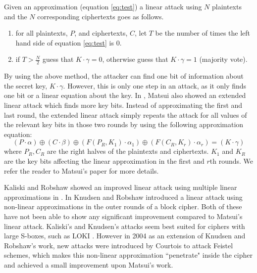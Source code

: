 Given an approximation (equation \ref{eq:test}) a linear attack using $N$ plaintexts and the $N$ corresponding ciphertexts goes as follows\cite{matsui1994linear}. 

\begin{enumerate}
	
	\item for all plaintexts, $P$, and ciphertexts, $C$, let $T$ be the number of times the left hand side of equation \ref{eq:test} is 0.
	\item if $T > \frac{N}{2}$ guess that $K \cdot \gamma = 0$, otherwise guess that $K \cdot \gamma = 1$ (majority vote).
	
\end{enumerate}
By using the above method, the attacker can find one bit of information about the secret key, $K \cdot \gamma$. However, this is only one step in an attack, as it only finds one bit or a linear equation about the key. In \cite{matsui1994linear}, Matsui also showed an extended linear attack which finds more key bits. Instead of approximating the first and last round, the extended linear attack simply repeats the attack for all values of the relevant key bits in those two rounds by using the following approximation equation: 
\begin{equation} \label{eq:linear2}
(P \cdot \alpha) \oplus (C \cdot \beta) \oplus (F(P_{R},K_{1}) \cdot \alpha_{1}) \oplus (F(C_{R},K_{r}) \cdot \alpha_{r}) = (K \cdot \gamma)
\end{equation}
where $P_{R}, C_{R}$ are the right halves of the plaintexts and ciphertexts. $K_{1}$ and $K_{R}$ are the key bits affecting the linear approximation in the first and $r$th rounds. We refer the reader to Matsui's paper \cite{matsui1994linear} for more details.

Kaliski and Robshaw showed an improved linear attack using multiple linear approximations in \cite{kaliski1994linear}. In \cite{kilian1996protect} Knudsen and Robshaw introduced a linear attack using non-linear approximations in the outer rounds of a block cipher. Both of these have not been able to show any significant improvement compared to Matsui's linear attack. Kaliski's and Knudsen's attacks seem best suited for ciphers with large S-boxes, such as LOKI \cite{brown1990loki,kilian1996protect}. However in 2004 as an extension of Knudsen and Robshaw's work, new attacks were introduced by Courtois \cite{courtois2004feistel} to attack Feistel schemes, which makes this non-linear approximation ``penetrate" inside the cipher and achieved a small improvement upon Matsui's work.

